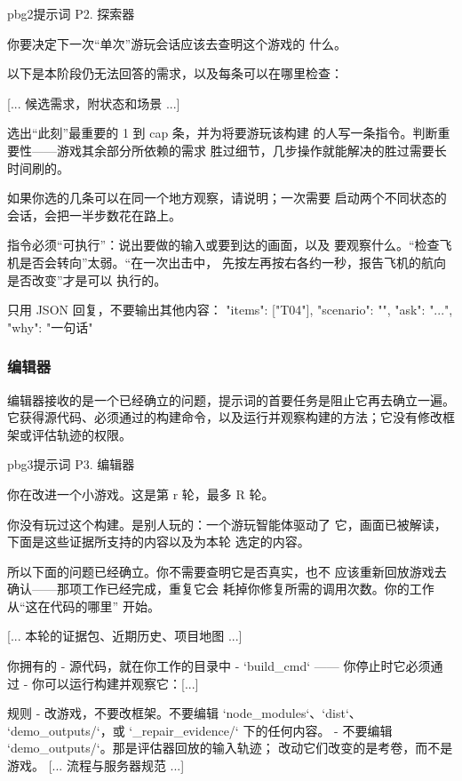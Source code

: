 \begin{promptbox}{pbg2}{提示词 P2. 探索器}
\begin{PV}
你要决定下一次“单次”游玩会话应该去查明这个游戏的
什么。

以下是本阶段仍无法回答的需求，以及每条可以在哪里检查：

[... 候选需求，附状态和场景 ...]

选出“此刻”最重要的 1 到 {cap} 条，并为将要游玩该构建
的人写一条指令。判断重要性——游戏其余部分所依赖的需求
胜过细节，几步操作就能解决的胜过需要长时间刷的。

如果你选的几条可以在同一个地方观察，请说明；一次需要
启动两个不同状态的会话，会把一半步数花在路上。

指令必须“可执行”：说出要做的输入或要到达的画面，以及
要观察什么。“检查飞机是否会转向”太弱。“在一次出击中，
先按左再按右各约一秒，报告飞机的航向是否改变”才是可以
执行的。

只用 JSON 回复，不要输出其他内容：
{"items": ["T04"], "scenario": "", "ask": "...", "why": "一句话"}
\end{PV}
\end{promptbox}

\subsubsection{编辑器}
编辑器接收的是一个已经确立的问题，提示词的首要任务是阻止它再去确立一遍。它获得源代码、必须通过的构建命令，以及运行并观察构建的方法；它没有修改框架或评估轨迹的权限。

\begin{promptbox}{pbg3}{提示词 P3. 编辑器}
\begin{PV}
你在改进一个小游戏。这是第 {r} 轮，最多 {R} 轮。

你没有玩过这个构建。是别人玩的：一个游玩智能体驱动了
它，画面已被解读，下面是这些证据所支持的内容以及为本轮
选定的内容。

所以下面的问题已经确立。你不需要查明它是否真实，也不
应该重新回放游戏去确认——那项工作已经完成，重复它会
耗掉你修复所需的调用次数。你的工作从“这在代码的哪里”
开始。

[... 本轮的证据包、近期历史、项目地图 ...]

你拥有的
  - 源代码，就在你工作的目录中
  - `{build_cmd}` —— 你停止时它必须通过
  - 你可以运行构建并观察它：[...]

规则
  - 改游戏，不要改框架。不要编辑 `node_modules`、`dist`、
    `demo_outputs/`，或 `_repair_evidence/` 下的任何内容。
  - 不要编辑 `demo_outputs/`。那是评估器回放的输入轨迹；
    改动它们改变的是考卷，而不是游戏。
  [... 流程与服务器规范 ...]
\end{PV}
\end{promptbox}

